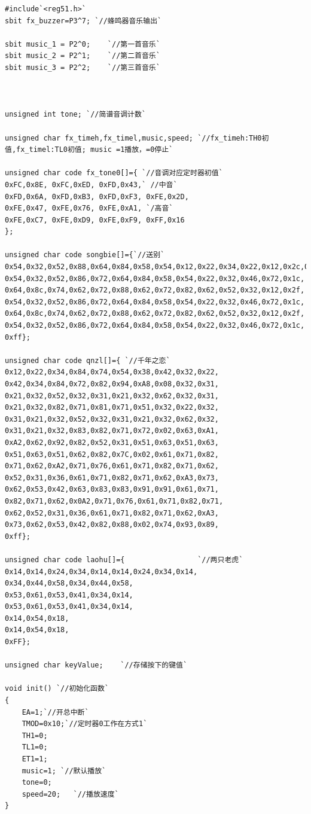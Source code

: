\documentclass[UTF8]{ctexart}
\begin{document}
\begin{lstlisting}
#include`<reg51.h>`
sbit fx_buzzer=P3^7; `//蜂鸣器音乐输出`

sbit music_1 = P2^0;	`//第一首音乐`
sbit music_2 = P2^1;	`//第二首音乐`
sbit music_3 = P2^2;	`//第三首音乐`



unsigned int tone; `//简谱音调计数`

unsigned char fx_timeh,fx_timel,music,speed; `//fx_timeh:TH0初值,fx_timel:TL0初值; music =1播放，=0停止`

unsigned char code fx_tone0[]={ `//音调对应定时器初值`
0xFC,0x8E, 0xFC,0xED, 0xFD,0x43,` //中音`
0xFD,0x6A, 0xFD,0xB3, 0xFD,0xF3, 0xFE,0x2D,
0xFE,0x47, 0xFE,0x76, 0xFE,0xA1, `/高音`
0xFE,0xC7, 0xFE,0xD9, 0xFE,0xF9, 0xFF,0x16
};

unsigned char code songbie[]={`//送别`
0x54,0x32,0x52,0x88,0x64,0x84,0x58,0x54,0x12,0x22,0x34,0x22,0x12,0x2c,0x04,
0x54,0x32,0x52,0x86,0x72,0x64,0x84,0x58,0x54,0x22,0x32,0x46,0x72,0x1c,
0x64,0x8c,0x74,0x62,0x72,0x88,0x62,0x72,0x82,0x62,0x52,0x32,0x12,0x2f,
0x54,0x32,0x52,0x86,0x72,0x64,0x84,0x58,0x54,0x22,0x32,0x46,0x72,0x1c,
0x64,0x8c,0x74,0x62,0x72,0x88,0x62,0x72,0x82,0x62,0x52,0x32,0x12,0x2f,
0x54,0x32,0x52,0x86,0x72,0x64,0x84,0x58,0x54,0x22,0x32,0x46,0x72,0x1c,
0xff};

unsigned char code qnzl[]={ `//千年之恋`
0x12,0x22,0x34,0x84,0x74,0x54,0x38,0x42,0x32,0x22,
0x42,0x34,0x84,0x72,0x82,0x94,0xA8,0x08,0x32,0x31,
0x21,0x32,0x52,0x32,0x31,0x21,0x32,0x62,0x32,0x31,
0x21,0x32,0x82,0x71,0x81,0x71,0x51,0x32,0x22,0x32,
0x31,0x21,0x32,0x52,0x32,0x31,0x21,0x32,0x62,0x32,
0x31,0x21,0x32,0x83,0x82,0x71,0x72,0x02,0x63,0xA1,
0xA2,0x62,0x92,0x82,0x52,0x31,0x51,0x63,0x51,0x63,
0x51,0x63,0x51,0x62,0x82,0x7C,0x02,0x61,0x71,0x82,
0x71,0x62,0xA2,0x71,0x76,0x61,0x71,0x82,0x71,0x62,
0x52,0x31,0x36,0x61,0x71,0x82,0x71,0x62,0xA3,0x73,
0x62,0x53,0x42,0x63,0x83,0x83,0x91,0x91,0x61,0x71,
0x82,0x71,0x62,0x0A2,0x71,0x76,0x61,0x71,0x82,0x71,
0x62,0x52,0x31,0x36,0x61,0x71,0x82,0x71,0x62,0xA3,
0x73,0x62,0x53,0x42,0x82,0x88,0x02,0x74,0x93,0x89,
0xff};

unsigned char code laohu[]={                 `//两只老虎`
0x14,0x14,0x24,0x34,0x14,0x14,0x24,0x34,0x14,
0x34,0x44,0x58,0x34,0x44,0x58,
0x53,0x61,0x53,0x41,0x34,0x14,
0x53,0x61,0x53,0x41,0x34,0x14,
0x14,0x54,0x18,
0x14,0x54,0x18,
0xFF};

unsigned char keyValue;	   `//存储按下的键值`

void init() `//初始化函数`
{
	EA=1;`//开总中断`
	TMOD=0x10;`//定时器0工作在方式1`
	TH1=0;
	TL1=0;
	ET1=1;
	music=1; `//默认播放`
	tone=0;
	speed=20; 	`//播放速度`
}



\end{lstlisting}
\end{document}
